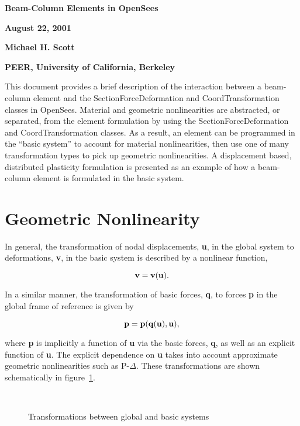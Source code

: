 \documentclass[12pt]{article}
\begin{document}
\newcommand{\pd}[2]{\frac{\partial{#1}}{\partial{#2}}}

\begin{center}
{\bf \Large Beam-Column Elements in OpenSees}

{\bf August 22, 2001} 

{\bf Michael H. Scott} 

{\bf PEER, University of California, Berkeley}
\end{center}

This document provides a brief description of the interaction between a beam-column
element and the SectionForceDeformation and CoordTransformation classes in OpenSees.
Material and geometric nonlinearities are abstracted, or separated, from the
element formulation by using the SectionForceDeformation and CoordTransformation
classes. As a result, an element can be programmed in the ``basic system'' to account
for material nonlinearities, then use one of many transformation types to pick
up geometric nonlinearities.
A displacement based, distributed plasticity formulation is presented as an
example of how a beam-column element is formulated in the basic system.

\section{Geometric Nonlinearity}
In general, the transformation of nodal displacements, {\bf u}, in the global system
to deformations, {\bf v}, in the basic system is described by a nonlinear
function,

\begin{equation}
\label{eq:v=v(u)}
{\bf v} = {\bf v}({\bf u}).
\end{equation}

In a similar manner, the transformation of basic forces, {\bf q}, to forces
{\bf p} in the global frame of reference is given by

\begin{equation}
\label{eq:p=p(q,u)}
{\bf p} = {\bf p}({\bf q}({\bf u}), {\bf u}),
\end{equation}

\noindent where {\bf p} is implicitly a function of {\bf u} via the basic forces,
{\bf q}, as well as an explicit function of {\bf u}. The explicit dependence on
{\bf u} takes into account \p approximate geometric nonlinearities such as
P-$\Delta$. These transformations are shown schematically in
figure~\ref{fig:Transformation}.

\begin{figure}[htpb]
\begin{center}
\leavevmode
\hbox{%
\epsfxsize=6.0in
}
\end{center}
\caption{Transformations between global and basic systems}
\label{fig:Transformation}
\end{figure}
\end{document}
